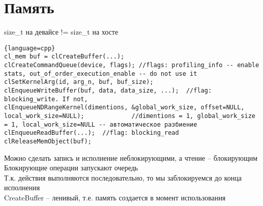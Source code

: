 \documentclass[12pt]{article}
\begin{document}
\section{Память}
size\_t на девайсе != size\_t на хосте
\begin{lstlisting}{language=cpp}
cl_mem buf = clCreateBuffer(...);
clCreateCommandQueue(device, flags); //flags: profiling_info -- enable stats, out_of_order_execution_enable -- do not use it
clSetKernelArg(id, arg_n, buf, buf_size);
clEnqueueWriteBuffer(buf, data, data_size, ...);  //flag: blocking_write. If not, 
clEnqueueNDRangeKernel(dimentions, &global_work_size, offset=NULL, local_work_size=NULL);             //dimentions = 1, global_work_size = 1, local_work_size=NULL -- автоматическое разбиение
clEnqueueReadBuffer(...);  //flag: blocking_read
clReleaseMemObject(buf);
\end{lstlisting}
Можно сделать запись и исполнение неблокирующими, а чтение -- блокирующим\\
Блокирующие операции запускают очередь\\
Т.к. действия выполняются последовательно, то мы заблокируемся до конца исполнения\\
CreateBuffer -- ленивый, т.е. память создается в момент использования
\end{document}
